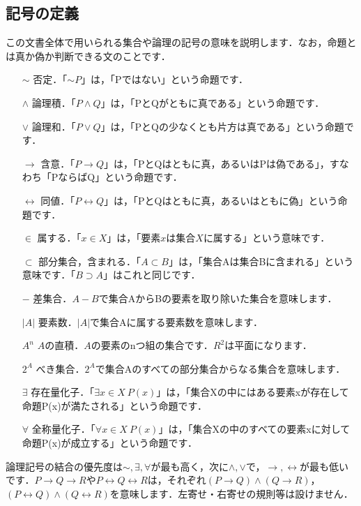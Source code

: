 \subsection{記号の定義}
この文書全体で用いられる集合や論理の記号の意味を説明します．なお，命題とは真か偽か判断できる文のことです．
\begin{itemize}
    \item[$\sim$]
        否定．「$\sim P$」は，「Pではない」という命題です．
    \item[$\land$]
        論理積．「$P \land Q$」は，「PとQがともに真である」という命題です．
    \item[$\lor$]
        論理和．「$P \lor Q$」は，「PとQの少なくとも片方は真である」という命題です．
    \item[$\to$]
        含意．「$P \to Q$」は，「PとQはともに真，あるいはPは偽である」，すなわち「PならばQ」という命題です．
    \item[$\leftrightarrow$]
        同値．「$P \leftrightarrow Q$」は，「PとQはともに真，あるいはともに偽」という命題です．
    \item[$\in$]
        属する．「$x \in X$」は，「要素$x$は集合$X$に属する」という意味です．
    \item[$\subset$]
        部分集合，含まれる．「$A \subset B$」は，「集合Aは集合Bに含まれる」という意味です．「$B \supset A$」はこれと同じです．
    \item[$-$]
        差集合．$A-B$で集合AからBの要素を取り除いた集合を意味します．
    \item[$|A|$]
        要素数．$|A|$で集合Aに属する要素数を意味します．
    \item[$A^n$]
        $A$の直積．$A$の要素のnつ組の集合です．$R^2$は平面になります．
    \item[$2^A$]
        べき集合．$2^A$で集合Aのすべての部分集合からなる集合を意味します．
    \item[$\exists$]
        存在量化子．「$\exists x \in X \: P(x)$」は，「集合Xの中にはある要素xが存在して命題P(x)が満たされる」という命題です．    
    \item[$\forall$]
        全称量化子．「$\forall x \in X \: P(x)$」は，「集合Xの中のすべての要素xに対して命題P(x)が成立する」という命題です．
\end{itemize}

論理記号の結合の優先度は$\sim,\exists,\forall$が最も高く，次に$\land,\lor$で，$\to,\leftrightarrow$が最も低いです．$P \to Q \to R$や$P \leftrightarrow Q \leftrightarrow R$は，それぞれ$(P \to Q) \land (Q \to R)$，$(P \leftrightarrow Q) \land (Q \leftrightarrow R)$を意味します．左寄せ・右寄せの規則等は設けません．

